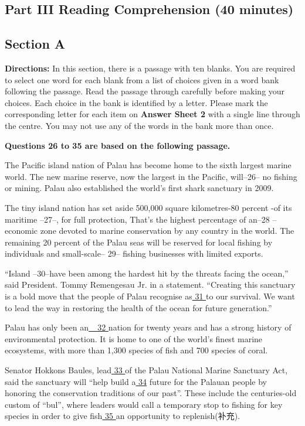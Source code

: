 \documentclass[UTF8,11pt]{ctexart}
\begin{document}
\subsection*{\textbf{Part III} \textbf{Reading Comprehension} \textbf{(40 minutes)}}


\subsection*{\textbf{Section A}}


\textbf{Directions:} In this section, there is a passage with ten blanks. You are required to select one word for each blank from a list of choices given in a word bank following the passage. Read the passage through carefully before making your choices. Each choice in the bank is identified by a letter. Please mark the corresponding letter for each item on\textbf{ Answer Sheet 2} with a single line through the centre. You may not use any of the words in the bank more than once.


\textbf{Questions 26 to 35 are based on the following passage.}


The Pacific island nation of Palau has become home to the sixth largest marine world. The new marine reserve, now the largest in the Pacific, will--26-- no fishing or mining. Palau also established the world’s first shark sanctuary in 2009.


The tiny island nation has set aside 500,000 square kilometres-80 percent -of its maritime --27--, for full protection, That’s the highest percentage of an--28 --economic zone devoted to marine conservation by any country in the world. The remaining 20 percent of the Palau seas will be reserved for local fishing by individuals and small-scale-- 29-- fishing businesses with limited exports.


“Island --30--have been among the hardest hit by the threats facing the ocean,” said President. Tommy Remengesau Jr. in a statement. “Creating this sanctuary is a bold move that the people of Palau recognise as\uline{ 31 }to our survival. We want to lead the way in restoring the health of the ocean for future generation.”


Palau has only been an\uline{\_ 32 }nation for twenty years and has a strong history of environmental protection. It is home to one of the world’s finest marine ecosystems, with more than 1,300 species of fish and 700 species of coral.


Senator Hokkons Baules, lead\uline{ 33 }of the Palau National Marine Sanctuary Act, said the sanctuary will “help build a\uline{ 34} future for the Palauan people by honoring the conservation traditions of our past”. These include the centuries-old custom of “bul”, where leaders would call a temporary stop to fishing for key species in order to give fish\uline{ 35 }an opportunity to replenish(补充).
\end{document}
